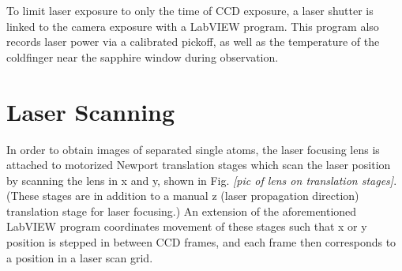 To limit laser exposure to only the time of CCD exposure, a laser shutter is linked to the camera exposure with a LabVIEW program.  This program also records laser power via a calibrated pickoff, as well as the temperature of the coldfinger near the sapphire window during observation.

\section{Laser Scanning}

In order to obtain images of separated single atoms, the laser focusing lens is attached to motorized Newport translation stages which scan the laser position by scanning the lens in x and y, shown in Fig. \emph{\color{red}[pic of lens on translation stages]}.  (These stages are in addition to a manual z (laser propagation direction) translation stage for laser focusing.)  An extension of the aforementioned LabVIEW program coordinates movement of these stages such that x or y position is stepped in between CCD frames, and each frame then corresponds to a position in a laser scan grid.  